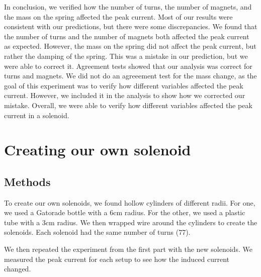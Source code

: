 \documentclass[11pt]{article}
\let\oldsection\section
\renewcommand\section{\clearpage\oldsection}
\begin{document}
    In conclusion, we verified how the number of turns, the number of magnets, and the mass on the spring affected the peak current.
    Most of our results were consistent with our predictions, but there were some discrepancies.
    We found that the number of turns and the number of magnets both affected the peak current as expected.
    However, the mass on the spring did not affect the peak current, but rather the damping of the spring.
    This was a mistake in our prediction, but we were able to correct it.
    Agreement tests showed that our analysis was correct for turns and magnets.
    We did not do an agreeement test for the mass change, as the goal of this experiment was to verify how different variables affected the peak current.
    However, we included it in the analysis to show how we corrected our mistake.
    Overall, we were able to verify how different variables affected the peak current in a solenoid.


    \section{Creating our own solenoid}\label{sec:part_2}

    \subsection{Methods}\label{subsec:part_2_methods}

    To create our own solenoids, we found hollow cylinders of different radii.
    For one, we used a Gatorade bottle with a 6cm radius.
    For the other, we used a plastic tube with a 3cm radius.
    We then wrapped wire around the cylinders to create the solenoids.
    Each solenoid had the same number of turns (77).

    We then repeated the experiment from the first part with the new solenoids.
    We measured the peak current for each setup to see how the induced current changed.
\end{document}
